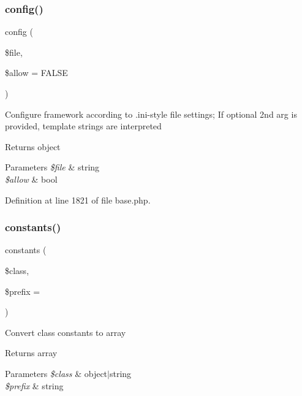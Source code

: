 \hypertarget{class_base_a9b5adda44e6db1d1f45cf1e4a6be5ce1}{}\label{class_base_a9b5adda44e6db1d1f45cf1e4a6be5ce1} 
\subsubsection{\texorpdfstring{config()}{config()}}
{\footnotesize\ttfamily config (\begin{DoxyParamCaption}\item[{}]{\$file,  }\item[{}]{\$allow = {\ttfamily FALSE} }\end{DoxyParamCaption})}

Configure framework according to .ini-\/style file settings; If optional 2nd arg is provided, template strings are interpreted \begin{DoxyReturn}{Returns}
object 
\end{DoxyReturn}

\begin{DoxyParams}{Parameters}
{\em \$file} & string \\
\hline
{\em \$allow} & bool \\
\hline
\end{DoxyParams}


Definition at line 1821 of file base.\+php.

\hypertarget{class_base_a8906c778c90cf5be4c1d76cd005945c5}{}\label{class_base_a8906c778c90cf5be4c1d76cd005945c5} 
\subsubsection{\texorpdfstring{constants()}{constants()}}
{\footnotesize\ttfamily constants (\begin{DoxyParamCaption}\item[{}]{\$class,  }\item[{}]{\$prefix = {\ttfamily \textquotesingle{}\textquotesingle{}} }\end{DoxyParamCaption})}

Convert class constants to array \begin{DoxyReturn}{Returns}
array 
\end{DoxyReturn}

\begin{DoxyParams}{Parameters}
{\em \$class} & object$\vert$string \\
\hline
{\em \$prefix} & string \\
\hline
\end{DoxyParams}


